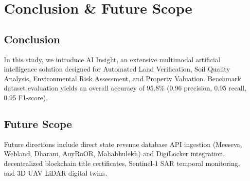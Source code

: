 \documentclass[conference]{IEEEtran}
\begin{document}
\section{Conclusion \& Future Scope}

\subsection{Conclusion}
In this study, we introduce AI Insight, an extensive multimodal artificial intelligence solution designed for Automated Land Verification, Soil Quality Analysis, Environmental Risk Assessment, and Property Valuation. Benchmark dataset evaluation yields an overall accuracy of 95.8\% (0.96 precision, 0.95 recall, 0.95 F1-score).

\subsection{Future Scope}
Future directions include direct state revenue database API ingestion (Meeseva, Webland, Dharani, AnyRoOR, Mahabhulekh) and DigiLocker integration, decentralized blockchain title certificates, Sentinel-1 SAR temporal monitoring, and 3D UAV LiDAR digital twins.
\end{document}
